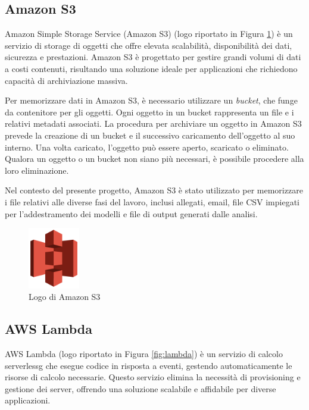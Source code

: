 \subsection{Amazon S3}
Amazon Simple Storage Service (Amazon S3) (logo riportato in Figura \ref{fig:s3}) è un servizio di storage di oggetti che offre elevata scalabilità, disponibilità dei dati, sicurezza e prestazioni. Amazon S3 è progettato per gestire grandi volumi di dati a costi contenuti, risultando una soluzione ideale per applicazioni che richiedono capacità di archiviazione massiva.

Per memorizzare dati in Amazon S3, è necessario utilizzare un \textit{bucket}, che funge da contenitore per gli oggetti. Ogni oggetto in un bucket rappresenta un file e i relativi metadati associati. La procedura per archiviare un oggetto in Amazon S3 prevede la creazione di un bucket e il successivo caricamento dell'oggetto al suo interno. Una volta caricato, l'oggetto può essere aperto, scaricato o eliminato. Qualora un oggetto o un bucket non siano più necessari, è possibile procedere alla loro eliminazione.

Nel contesto del presente progetto, Amazon S3 è stato utilizzato per memorizzare i file relativi alle diverse fasi del lavoro, inclusi allegati, email, file CSV impiegati per l'addestramento dei modelli e file di output generati dalle analisi. 


\begin{figure}[h]
  \centering
  \includegraphics[width=0.2\textwidth]{img/tecnologie/s3.png}
  \caption{Logo di Amazon S3}
  \label{fig:s3}
\end{figure}

\subsection{AWS Lambda}
AWS Lambda (logo riportato in Figura \ref{fig:lambda}) è un servizio di calcolo \gls{serverlessg} che esegue codice in risposta a eventi, gestendo automaticamente le risorse di calcolo necessarie. Questo servizio elimina la necessità di provisioning e gestione dei server, offrendo una soluzione scalabile e affidabile per diverse applicazioni.

